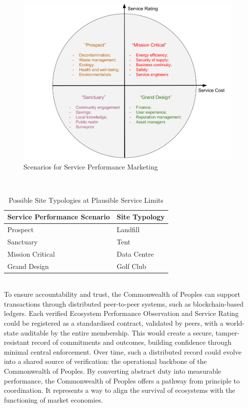 \documentclass[12pt, oneside]{article}   	%
\begin{document}
\begin{figure}[H]
\centering
\includegraphics[width=1\textwidth]{scenarios}
\caption{Scenarios for Service Performance Marketing}
\label{Scenarios}
\end{figure}\\

\begin{table}[H]
\caption{Possible Site Typologies at Plausible Service Limits}
\begin{center}
\begin{tabular}{| l | l |}
\hline
Service Performance Scenario&Site Typology\\
\hline
Prospect&Landfill\\
Sanctuary&Tent\\
Mission Critical&Data Centre\\
Grand Design&Golf Club\\
\hline
\end{tabular}
\end{center}
\label{Service limits table}
\end{table}\\

To ensure accountability and trust, the Commonwealth of Peoples can support transactions through distributed peer-to-peer systems, such as blockchain-based ledgers.
Each verified Ecosystem Performance Observation and Service Rating could be registered as a standardised contract, validated by peers, with a world-state auditable by the entire membership.
This would create a secure, tamper-resistant record of commitments and outcomes, building confidence through minimal central enforcement.
Over time, such a distributed record could evolve into a shared source of verification: the operational backbone of the Commonwealth of Peoples.
By converting abstract duty into measurable performance, the Commonwealth of Peoples offers a pathway from principle to coordination.
It represents a way to align the survival of ecosystems with the functioning of market economies.\\
\end{document}
